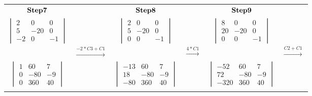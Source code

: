 \documentclass[]{article}
\begin{document}
\begingroup

\begin{tabular}{ c c c c c c}
$\bold{Step 7}$ &  & $\bold{Step 8}$  &  & $\bold{Step 9}$ \\
$\begin{vmatrix} 2 & 0 & 0\\ 5 & -20 & 0 \\ -2 & 0 & -1 \end{vmatrix}$ &  & $\begin{vmatrix} 2 & 0 & 0\\ 5 & -20 & 0 \\ 0 & 0 & -1 \end{vmatrix}$ &  &
$\begin{vmatrix} 8 & 0 & 0\\ 20 & -20 & 0 \\ 0 & 0 & -1 \end{vmatrix}$\\
 & $\xrightarrow{-2*C3 +C1}$ &  & $\xrightarrow{4*C1}$ & & $\xrightarrow{C2 + C1}$ \\ 
$\begin{vmatrix} 1 &   60 &   7\\ 0 &   -80 &   -9 \\ 0 &   360 &   40 \end{vmatrix}$ &  &
$\begin{vmatrix} -13 &  60 &   7\\ 18 &   -80 &   -9\\ -80 & 360 &   40 \end{vmatrix}$ & &
$\begin{vmatrix} -52 &   60 &  7\\ 72 &   -80 &   -9 \\ -320 & 360 &   40 \end{vmatrix}$\\
 &  &  \\
\end{tabular}

\endgroup

\hspace{3cm}

\begingroup
\end{document}

